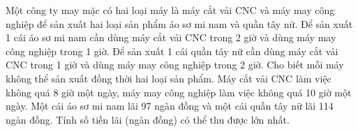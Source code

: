 \begin{ex}
 Một công ty may mặc có hai loại máy là máy cắt vải CNC và máy may công nghiệp để sản xuất hai loại sản phẩm áo sơ mi nam và quần tây nữ. Để sản xuất 1 cái áo sơ mi nam cần dùng máy cắt vải CNC trong 2 giờ và dùng máy may công nghiệp trong 1 giờ. Để sản xuất 1 cái quần tây nữ cần dùng máy cắt vải CNC trong 1 giờ và dùng máy may công nghiệp trong 2 giờ. Cho biết mỗi máy không thể sản xuất đồng thời hai loại sản phẩm. Máy cắt vải CNC làm việc không quá 8 giờ một ngày, máy may công nghiệp làm việc không quá 10 giờ một ngày. Một cái áo sơ mi nam lãi 97 ngàn đồng và một cái quần tây nữ lãi 114 ngàn đồng. Tính số tiền lãi (ngàn đồng) có thể thu được lớn nhất.


\end{ex}

